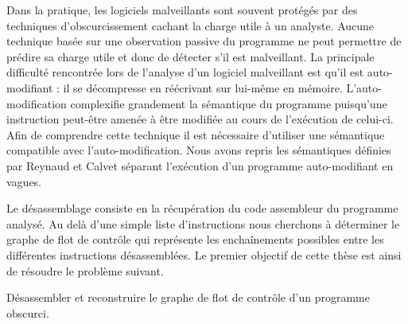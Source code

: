 Dans la pratique, les logiciels malveillants sont souvent protégés par des techniques d'obscurcissement cachant la charge utile à un analyste.
Aucune technique basée sur une observation passive du programme ne peut permettre de prédire sa charge utile et donc de détecter s'il est malveillant.
La principale difficulté rencontrée lors de l'analyse d'un logiciel malveillant est qu'il est auto-modifiant : il se décompresse en réécrivant sur lui-même en mémoire. L'auto-modification complexifie grandement la sémantique du programme puisqu'une instruction peut-être amenée à être modifiée au cours de l'exécution de celui-ci.
Afin de comprendre cette technique il est nécessaire d'utiliser une sémantique compatible avec l'auto-modification.
Nous avons repris les sémantiques définies par Reynaud \cite{Reynaud2010} et Calvet \cite{Calvet2013} séparant l'exécution d'un programme auto-modifiant en vagues. 

Le désassemblage consiste en la récupération du code assembleur du programme analysé.
Au delà d'une simple liste d'instructions nous cherchons à déterminer le graphe de flot de contrôle qui représente les enchaînements possibles entre les différentes instructions désassemblées.
Le premier objectif de cette thèse est ainsi de résoudre le problème suivant.

\begin{pbb}
 Désassembler et reconstruire le graphe de flot de contrôle d'un programme obscurci.
\end{pbb}






